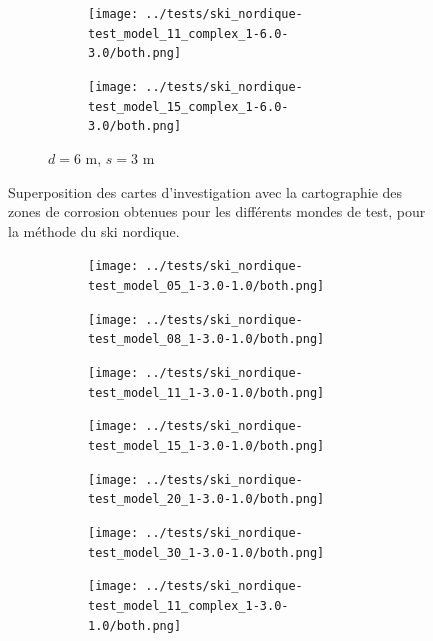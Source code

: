 \documentclass[francais,RandD]{rapportPFE}
\begin{document}
\begin{figure}[H]
\begin{subfigure}[t]{\linewidth}
\begin{subfigure}[t]{0.11\linewidth}
					\texttt{[image: ../tests/ski\_nordique-test\_model\_11\_complex\_1-6.0-3.0/both.png]}
				\end{subfigure}
				\hfill
				\begin{subfigure}[t]{0.11\linewidth}
					\texttt{[image: ../tests/ski\_nordique-test\_model\_15\_complex\_1-6.0-3.0/both.png]}
				\end{subfigure}
				\caption{$d = 6$ m, $s = 3$ m}
			\end{subfigure}
			\caption{Superposition des cartes d'investigation avec la cartographie des zones de corrosion obtenues pour les différents mondes de test, pour la méthode du ski nordique.}
			\label{fig:ski_nordique_resultats}
		\end{figure}

		\begin{figure}[H]
			\centering
			\begin{subfigure}[t]{\linewidth}
				\centering
				\begin{subfigure}[t]{0.11\linewidth}
					\texttt{[image: ../tests/ski\_nordique-test\_model\_05\_1-3.0-1.0/both.png]}
				\end{subfigure}
				\hfill
				\begin{subfigure}[t]{0.11\linewidth}
					\texttt{[image: ../tests/ski\_nordique-test\_model\_08\_1-3.0-1.0/both.png]}
				\end{subfigure}
				\hfill
				\begin{subfigure}[t]{0.11\linewidth}
					\texttt{[image: ../tests/ski\_nordique-test\_model\_11\_1-3.0-1.0/both.png]}
				\end{subfigure}
				\hfill
				\begin{subfigure}[t]{0.11\linewidth}
					\texttt{[image: ../tests/ski\_nordique-test\_model\_15\_1-3.0-1.0/both.png]}
				\end{subfigure}
				\hfill
				\begin{subfigure}[t]{0.11\linewidth}
					\texttt{[image: ../tests/ski\_nordique-test\_model\_20\_1-3.0-1.0/both.png]}
				\end{subfigure}
				\hfill
				\begin{subfigure}[t]{0.11\linewidth}
					\texttt{[image: ../tests/ski\_nordique-test\_model\_30\_1-3.0-1.0/both.png]}
				\end{subfigure}
				\hfill
				\begin{subfigure}[t]{0.11\linewidth}
					\texttt{[image: ../tests/ski\_nordique-test\_model\_11\_complex\_1-3.0-1.0/both.png]}
				\end{subfigure}
				\hfill

\end{subfigure}
\end{figure}
\end{document}

